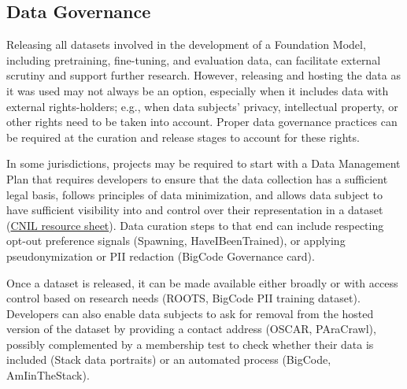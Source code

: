 \subsection{Data Governance}

Releasing all datasets involved in the development of a Foundation Model, including pretraining, fine-tuning, and evaluation data, can facilitate external scrutiny and support further research. However, releasing and hosting the data as it was used may not always be an option, especially when it includes data with external rights-holders; e.g., when data subjects' privacy, intellectual property, or other rights need to be taken into account. Proper data governance practices can be required at the curation and release stages to account for these rights.

In some jurisdictions, projects may be required to start with a Data Management Plan that requires developers to ensure that the data collection has a sufficient legal basis, follows principles of data minimization, and allows data subject to have sufficient visibility into and control over their representation in a dataset (\href{https://www.cnil.fr/en/ai-how-sheets}{CNIL resource sheet}). Data curation steps to that end can include respecting opt-out preference signals (Spawning, HaveIBeenTrained), or applying pseudonymization or PII redaction (BigCode Governance card). 

Once a dataset is released, it can be made available either broadly or with access control based on research needs (ROOTS, BigCode PII training dataset). Developers can also enable data subjects to ask for removal from the hosted version of the dataset by providing a contact address (OSCAR, PAraCrawl), possibly complemented by a membership test to check whether their data is included (Stack data portraits) or an automated process (BigCode, AmIinTheStack).




